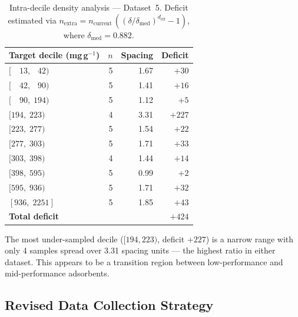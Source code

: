 \documentclass[12pt,a4paper]{article}
\begin{document}
\begin{table}[h]
\centering
\caption{Intra-decile density analysis — Dataset~5.
  Deficit estimated via
  $n_\text{extra} = n_\text{current}\,((\delta/\delta_\text{med})^{d_\text{eff}}-1)$,
  where $\delta_\text{med} = 0.882$.}
\label{tab:ds5_decile_deficit}
\small
\begin{tabular}{lrrr}
\toprule
Target decile (mg\,g$^{-1}$) & $n$ & Spacing & Deficit \\
\midrule
$[\phantom{00}13,\;\phantom{0}42)$ & 5 & 1.67 & $+30$ \\
$[\phantom{00}42,\;\phantom{0}90)$ & 5 & 1.41 & $+16$ \\
$[\phantom{00}90,\;194)$            & 5 & 1.12 & $+5$  \\
$[194,\;223)$                       & 4 & 3.31 & $+227$ \\
$[223,\;277)$                       & 5 & 1.54 & $+22$ \\
$[277,\;303)$                       & 5 & 1.71 & $+33$ \\
$[303,\;398)$                       & 4 & 1.44 & $+14$ \\
$[398,\;595)$                       & 5 & 0.99 & $+2$  \\
$[595,\;936)$                       & 5 & 1.71 & $+32$ \\
$[936,\;2251]$                      & 5 & 1.85 & $+43$ \\
\midrule
\textbf{Total deficit}              & & & $+424$ \\
\bottomrule
\end{tabular}
\end{table}

The most under-sampled decile ($[194, 223)$, deficit $+227$) is a narrow
range with only 4 samples spread over 3.31 spacing units — the highest
ratio in either dataset.  This appears to be a transition region between
low-performance and mid-performance adsorbents.

\subsection{Revised Data Collection Strategy}
\end{document}
